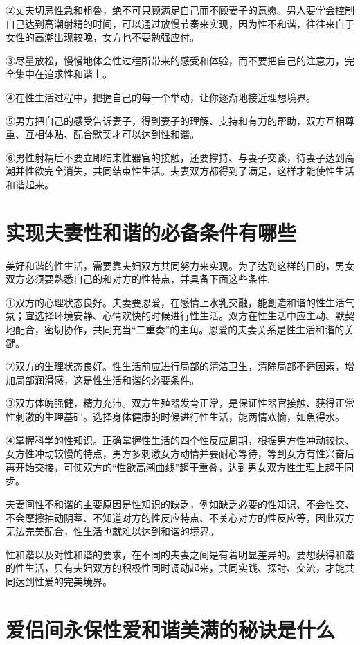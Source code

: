 \documentclass[12pt,UTF8]{ctexbook}
\begin{document}
②丈夫切忌性急和粗魯，绝不可只顾满足自己而不顾妻子的意愿。男人要学会控制自己达到高潮射精的时间，可以通过放慢节奏来实现，因为性不和谐，往往来自于女性的高潮出现较晚，女方也不要勉强应付。

③尽量放松，慢慢地体会性过程所带来的感受和体验，而不要把自己的注意力，完全集中在追求性和谐上。

④在性生活过程中，把握自己的每一个举动，让你逐渐地接近理想境界。

⑤男方把自己的感受告诉妻子，得到妻子的理解、支持和有力的帮助，双方互相尊重、互相体贴、配合默契才可以达到性和谐。

⑥男性射精后不要立即结束性器官的接触，还要撑持、与妻子交谈，待妻子达到高潮并性欲完全消失，共同结束性生活。夫妻双方都得到了满足，这样才能使性生活和谐起来。

\section{实现夫妻性和谐的必备条件有哪些}

美好和谐的性生活，需要靠夫妇双方共同努力来实现。为了达到这样的目的，男女双方必须要熟悉自己的和对方的性特点，并具备下面这些条件:

①双方的心理状态良好。夫妻要恩爱，在感情上水乳交融，能創造和谐的性生活气氛；宜选择环境安静、心情欢快的时候进行性生活。双方在性生活中应主动、默契地配合，密切协作，共同充当“二重奏”的主角。恩爱的夫妻关系是性生活和谐的关鍵。

②双方的生理状态良好。性生活前应进行局部的清洁卫生，清除局部不适因素，增加局部润滑感，这是性生活和谐的必要条件。

③双方体魄强健，精力充沛。双方生殖器发育正常，是保证性器官接触、获得正常性刺激的生理基础。选择身体健康的时候进行性生活，能两情欢愉，如魚得水。

④掌握科学的性知识。正确掌握性生活的四个性反应周期，根据男方性冲动较快、女方性冲动较慢的特点，男方多刺激女方动情并要耐心等待，等到女方有性兴奋后再开始交接，可使双方的“性欲高潮曲线”趨于重叠，达到男女双方性生理上趨于同步。

夫妻间性不和谐的主要原因是性知识的缺乏，例如缺乏必要的性知识、不会性交、不会摩擦抽动阴茎、不知道对方的性反应特点、不关心对方的性反应等，因此双方无法完美配合，性生活也就难以达到和谐的境界。

性和谐以及对性和谐的要求，在不同的夫妻之间是有着明显差异的。要想获得和谐的性生活，只有夫妇双方的积极性同时调动起来，共同实践、探討、交流，才能共同达到性爱的完美境界。

\section{爱侣间永保性爱和谐美满的秘诀是什么}
\end{document}
